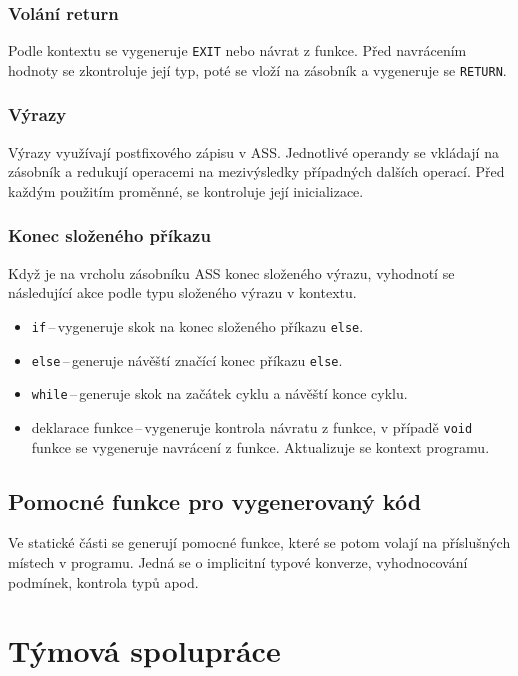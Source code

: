 \documentclass[a4paper, 12pt]{article}
\begin{document}
    \subsubsection{Volání return}
    Podle kontextu se vygeneruje \texttt{EXIT} nebo návrat z funkce. Před navrácením hodnoty se zkontroluje její typ, poté se vloží na zásobník a vygeneruje se \texttt{RETURN}.

    \subsubsection{Výrazy}
    Výrazy využívají postfixového zápisu v ASS. Jednotlivé operandy se vkládají na zásobník a redukují operacemi na mezivýsledky případných dalších operací. Před každým použitím proměnné, se kontroluje její inicializace.

    \subsubsection{Konec složeného příkazu} \label{konec slozeneho}
    Když je na vrcholu zásobníku ASS konec složeného výrazu, vyhodnotí se následující akce podle typu složeného výrazu v kontextu.
    \begin{itemize}
        \item \texttt{if}\,--\,vygeneruje skok na konec složeného příkazu \texttt{else}.
        \item \texttt{else}\,--\,generuje návěští značící konec příkazu \texttt{else}.
        \item \texttt{while}\,--\,generuje skok na začátek cyklu a návěští konce cyklu.
        \item deklarace funkce\,--\,vygeneruje kontrola návratu z funkce, v případě \texttt{void} funkce se vygeneruje navrácení z funkce. Aktualizuje se kontext programu.
    \end{itemize}

    \subsection{Pomocné funkce pro vygenerovaný kód} \label{pomocne}
    Ve statické části se generují pomocné funkce, které se potom volají na příslušných místech v programu. Jedná se o implicitní typové konverze, vyhodnocování podmínek, kontrola typů apod.

    \section{Týmová spolupráce}
\end{document}
